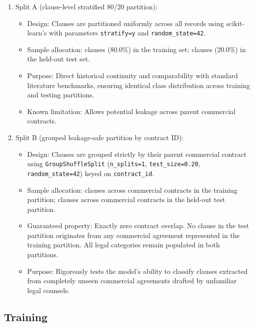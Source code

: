 \begin{enumerate}
    \item Split A (clause-level stratified 80/20 partition):
    \begin{itemize}
        \item Design: Clauses are partitioned uniformly across all \TotalClauses{} records using scikit-learn's  with parameters \texttt{stratify=y} and \texttt{random\_state=42}.

        \item Sample allocation: \SplitATrainClauses{} clauses (80.0\%) in the training set; \SplitATestClauses{} clauses (20.0\%) in the held-out test set.
        \item Purpose: Direct historical continuity and comparability with standard literature benchmarks, ensuring identical class distribution across training and testing partitions.
        \item Known limitation: Allows potential leakage across parent commercial contracts.
    \end{itemize}
    
    \item Split B (grouped leakage-safe partition by contract ID):
    \begin{itemize}
        \item Design: Clauses are grouped strictly by their parent commercial contract using \texttt{GroupShuffleSplit} (\texttt{n\_splits=1}, \texttt{test\_size=0.20}, \texttt{random\_state=42}) keyed on \texttt{contract\_id}.
        \item Sample allocation: \SplitBTrainClauses{} clauses across \SplitBTrainContracts{} commercial contracts in the training partition; \SplitBTestClauses{} clauses across \SplitBTestContracts{} commercial contracts in the held-out test partition.
        \item Guaranteed property: Exactly zero contract overlap. No clause in the test partition originates from any commercial agreement represented in the training partition. All \NumClasses{} legal categories remain populated in both partitions.
        \item Purpose: Rigorously tests the model's ability to classify clauses extracted from completely unseen commercial agreements drafted by unfamiliar legal counsels.
    \end{itemize}
\end{enumerate}

\subsection{Training}
\label{subsec:training}

